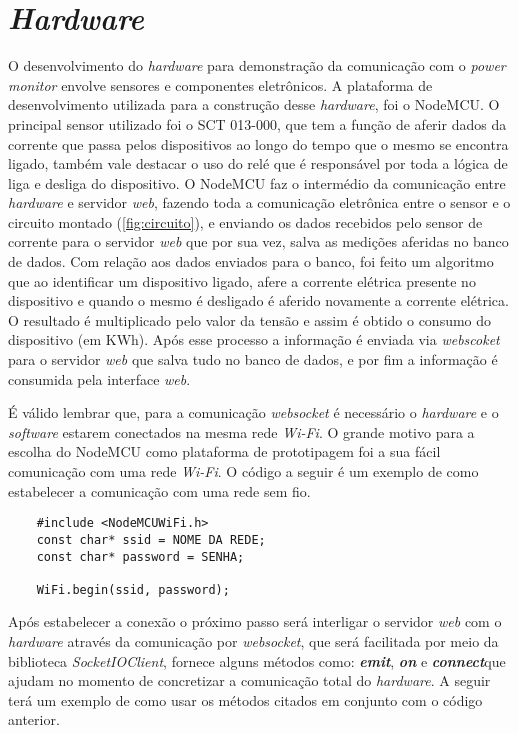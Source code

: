 \section[\textit{Hardware}]{\textit{Hardware}}\label{hard-sec}
O desenvolvimento do \textit{hardware} para demonstração da comunicação com o \textit{power monitor} envolve sensores e componentes
eletrônicos. A plataforma de desenvolvimento utilizada para a construção desse \textit{hardware}, foi o NodeMCU. O principal sensor
utilizado foi o SCT 013-000, que tem a função de aferir dados da corrente que passa pelos dispositivos ao longo do tempo que o mesmo se encontra
ligado, também vale destacar o uso do relé que é responsável por toda a lógica de liga e desliga do dispositivo. O NodeMCU faz o intermédio da comunicação entre 
\textit{hardware} e servidor \textit{web}, fazendo toda a comunicação eletrônica entre o sensor e o circuito montado (\autoref{fig:circuito}), e enviando os dados
recebidos pelo sensor de corrente para o servidor \textit{web} que por sua vez, salva as medições aferidas no banco de dados. Com relação aos dados enviados 
para o banco, foi feito um algoritmo que ao identificar um dispositivo ligado, afere a corrente elétrica presente no dispositivo e quando o mesmo é desligado 
é aferido novamente a corrente elétrica. O resultado é multiplicado pelo valor da tensão
e assim é obtido o consumo do dispositivo (em KWh). Após esse processo a informação é enviada via \textit{webscoket} 
para o servidor \textit{web} que salva tudo no banco de dados, e por fim a informação é consumida pela interface \textit{web}.

É válido lembrar que, para a comunicação \textit{websocket} é necessário o \textit{hardware} e o \textit{software} estarem conectados
na mesma rede \textit{Wi-Fi}. O grande motivo para a escolha do NodeMCU como plataforma de prototipagem foi a sua fácil comunicação com uma rede
\textit{Wi-Fi}. O código a seguir é um exemplo de como estabelecer a comunicação com uma rede sem fio.

\newpage

\begin{lstlisting}
	#include <NodeMCUWiFi.h>
	const char* ssid = NOME DA REDE;
	const char* password = SENHA;
	
	WiFi.begin(ssid, password);
\end{lstlisting}

Após estabelecer a conexão o próximo passo será interligar o servidor \textit{web} com o \textit{hardware} através da comunicação por \textit{websocket},
que será facilitada por meio da biblioteca \textit{SocketIOClient}, fornece alguns métodos como: \textit{\textbf{emit}}\protect\footnotemark, \textit{\textbf{on}}\protect\footnotemark 
e \textit{\textbf{connect}}\protect\footnotemark  que ajudam no momento de concretizar a comunicação total do \textit{hardware}. A seguir terá um
exemplo de como usar os métodos citados em conjunto com o código anterior.

